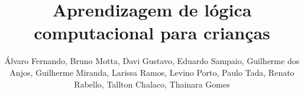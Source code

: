 \sloppy

\title{Aprendizagem de lógica computacional para crianças}

\author{Álvaro Fernando, Bruno Motta, Davi Gustavo, Eduardo Sampaio, Guilherme dos Anjos, Guilherme Miranda, Larissa Ramos, Levino Porto, Paulo Tada, Renato Rabello, Tallton Chalaco, Thainara Gomes}
\author{}

\address{Faculdade Gama - Universidade de Brasília (UnB)}

